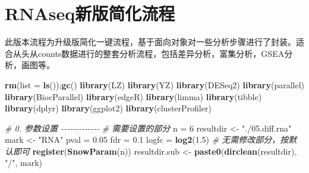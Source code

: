 \documentclass[
]{book}
\newenvironment{Shaded}{\begin{snugshade}}{\end{snugshade}}
\newcommand{\AttributeTok}[1]{\textcolor[rgb]{0.13,0.29,0.53}{#1}}
\newcommand{\CommentTok}[1]{\textcolor[rgb]{0.56,0.35,0.01}{\textit{#1}}}
\newcommand{\DecValTok}[1]{\textcolor[rgb]{0.00,0.00,0.81}{#1}}
\newcommand{\FloatTok}[1]{\textcolor[rgb]{0.00,0.00,0.81}{#1}}
\newcommand{\FunctionTok}[1]{\textcolor[rgb]{0.13,0.29,0.53}{\textbf{#1}}}
\newcommand{\NormalTok}[1]{#1}
\newcommand{\OtherTok}[1]{\textcolor[rgb]{0.56,0.35,0.01}{#1}}
\newcommand{\StringTok}[1]{\textcolor[rgb]{0.31,0.60,0.02}{#1}}
\begin{document}
\chapter{RNAseq新版简化流程}\label{rnaseq_new_pipeline}

此版本流程为升级版简化一键流程，基于面向对象对一些分析步骤进行了封装。适合从头从counts数据进行的整套分析流程，包括差异分析，富集分析，GSEA分析，画图等。

\begin{Shaded}
\begin{Highlighting}[]
\FunctionTok{rm}\NormalTok{(}\AttributeTok{list =} \FunctionTok{ls}\NormalTok{());}\FunctionTok{gc}\NormalTok{()}
\FunctionTok{library}\NormalTok{(LZ)}
\FunctionTok{library}\NormalTok{(YZ)}
\FunctionTok{library}\NormalTok{(DESeq2)}
\FunctionTok{library}\NormalTok{(parallel)}
\FunctionTok{library}\NormalTok{(BiocParallel)}
\FunctionTok{library}\NormalTok{(edgeR)}
\FunctionTok{library}\NormalTok{(limma)}
\FunctionTok{library}\NormalTok{(tibble)}
\FunctionTok{library}\NormalTok{(dplyr)}
\FunctionTok{library}\NormalTok{(ggplot2)}
\FunctionTok{library}\NormalTok{(clusterProfiler)}

\CommentTok{\# 0. 参数设置 {-}{-}{-}{-}{-}{-}{-}{-}{-}{-}{-}{-}{-}}
\CommentTok{\# 需要设置的部分}
\NormalTok{n }\OtherTok{=} \DecValTok{6}
\NormalTok{resultdir }\OtherTok{\textless{}{-}} \StringTok{"./05.diff.rna"}
\NormalTok{mark }\OtherTok{\textless{}{-}} \StringTok{"RNA"}
\NormalTok{pval }\OtherTok{=} \FloatTok{0.05}
\NormalTok{fdr }\OtherTok{=} \FloatTok{0.1}
\NormalTok{logfc }\OtherTok{=} \FunctionTok{log2}\NormalTok{(}\FloatTok{1.5}\NormalTok{)}
\CommentTok{\# 无需修改部分，按默认即可}
\FunctionTok{register}\NormalTok{(}\FunctionTok{SnowParam}\NormalTok{(n))}
\NormalTok{resultdir.sub }\OtherTok{\textless{}{-}} \FunctionTok{paste0}\NormalTok{(}\FunctionTok{dirclean}\NormalTok{(resultdir), }\StringTok{"/"}\NormalTok{, mark)}


\end{Highlighting}
\end{Shaded}
\end{document}
